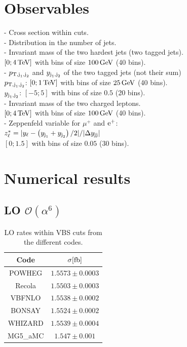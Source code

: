\documentclass[a4paper,10pt]{report}
\begin{document}
\section{Observables}
- Cross section within cuts. \\
- Distribution in the number of jets. \\
- Invariant mass of the two hardest jets (two tagged jets). \\
$[0; 4\,\text{TeV}]$ with bins of size $100\,\text{GeV}$ (40 bins). \\
- $p_{\text{T},\text{j}_1,\text{j}_2}$ and $y_{\text{j}_1,\text{j}_2}$ of the two tagged jets (not their sum) \\
$p_{\text{T},\text{j}_1,\text{j}_2}$: $[0; 1\,\text{TeV}]$ with bins of size $25\,\text{GeV}$ (40 bins). \\
$y_{\text{j}_1,\text{j}_2}$: $[-5;5]$ with bins of size $0.5$ (20 bins). \\
- Invariant mass of the two charged leptons. \\
$[0; 4\,\text{TeV}]$ with bins of size $100\,\text{GeV}$ (40 bins). \\
- Zeppenfeld variable for $\mu^+$ and $\text{e}^+$: \\
$z^*_\ell = |y_\ell - \left(y_{\text{j}_1}+y_{\text{j}_2} \right)/2|/|\Delta y_{\text{j}\text{j}}|$ \\
$[0;1.5]$ with bins of size $0.05$ (30 bins).

\section{Numerical results}

\subsection{LO $\mathcal{O}\left(\alpha^6\right)$}

\begin{table}[h!]
    \begin{tabular}{c|c}
        Code  &  $\sigma[\rm{fb}]$  \\
        \hline
        \hline
        {\sc POWHEG}  &  $1.5573 \pm 0.0003$ \\
        {\sc Recola}  &  $1.5503 \pm 0.0003$ \\
        {\sc VBFNLO}  &  $1.5538 \pm 0.0002$ \\
        {\sc BONSAY}  &  $1.5524 \pm 0.0002$ \\
        {\sc WHIZARD} &  $1.5539 \pm 0.0004$ \\
        {\sc MG5\_aMC}&  $1.547 \pm 0.001$   
    \end{tabular}
    \caption{\label{tab:LOrates} LO rates within VBS cuts from the different codes.}
\end{table}
\end{document}
